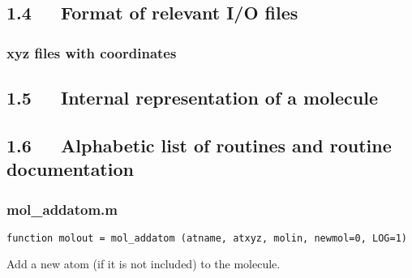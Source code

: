 \documentclass[a4paper]{article}
\begin{document}
\subsection{1.4~~~Format of relevant I/O files%
  \label{format-of-relevant-i-o-files}%
}


\subsubsection{xyz files with coordinates%
  \label{xyz-files-with-coordinates}%
}


\subsection{1.5~~~Internal representation of a molecule%
  \label{internal-representation-of-a-molecule}%
}


\subsection{1.6~~~Alphabetic list of routines and routine documentation%
  \label{alphabetic-list-of-routines-and-routine-documentation}%
}


\subsubsection{mol\_addatom.m%
  \label{mol-addatom-m}%
}
%
\octavelist
\begin{lstlisting}
function molout = mol_addatom (atname, atxyz, molin, newmol=0, LOG=1)
\end{lstlisting}

Add a new atom (if it is not included) to the molecule.
\end{document}
